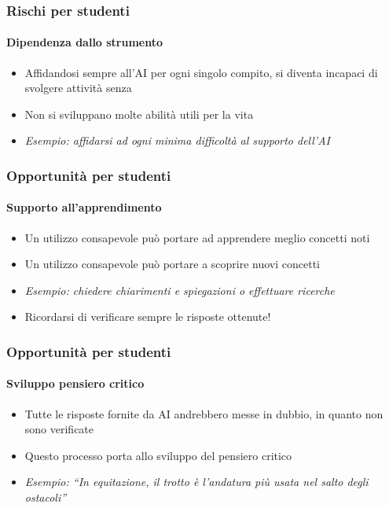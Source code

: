 \begin{contentframe}
    \frametitle{Rischi per studenti}
    \framesubtitle{Dipendenza dallo strumento}

    \begin{itemize}
        \item Affidandosi sempre all'AI per ogni singolo compito, si diventa incapaci di svolgere attività senza

        \bigskip
        \item Non si sviluppano molte abilità utili per la vita
        
        \bigskip
        \item \textit{Esempio: affidarsi ad ogni minima difficoltà al supporto dell'AI}
    \end{itemize}
\end{contentframe}

\begin{contentframe}
    \frametitle{Opportunità per studenti}
    \framesubtitle{Supporto all'apprendimento}

    \begin{itemize}
        \item Un utilizzo consapevole può portare ad apprendere meglio concetti noti
        \item Un utilizzo consapevole può portare a scoprire nuovi concetti

        \bigskip
        \item \textit{Esempio: chiedere chiarimenti e spiegazioni o effettuare ricerche}
        \item Ricordarsi di verificare sempre le risposte ottenute!
    \end{itemize}
\end{contentframe}

\begin{contentframe}
    \frametitle{Opportunità per studenti}
    \framesubtitle{Sviluppo pensiero critico}

    \begin{itemize}
        \item Tutte le risposte fornite da AI andrebbero messe in dubbio, in quanto non sono verificate
        \item Questo processo porta allo sviluppo del pensiero critico

        \bigskip
        \item \textit{Esempio: ``In equitazione, il trotto è l'andatura più usata nel salto degli ostacoli''}
    \end{itemize}
\end{contentframe}

